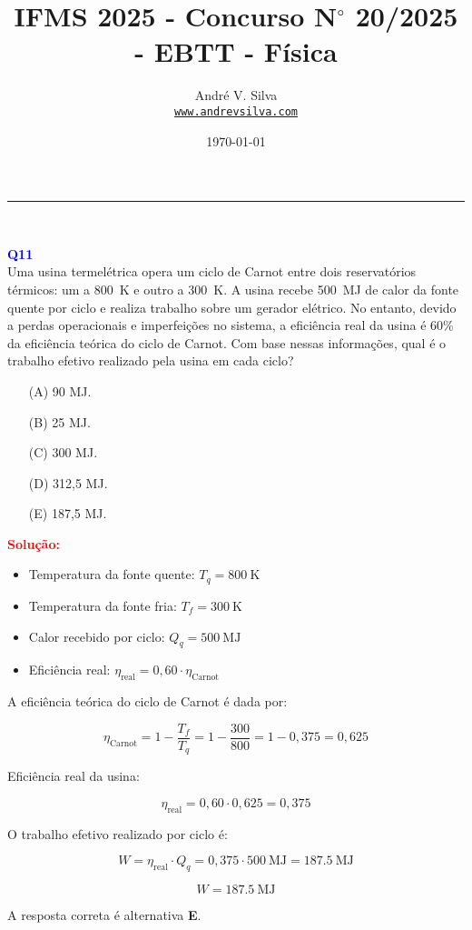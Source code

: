 \documentclass[a4paper,12pt]{article}
\title{ \textbf{\large IFMS 2025 - Concurso N$^{\circ}$ 20/2025 - EBTT - F\'isica}}
\author{Andr\'e V. Silva \\ \texttt{\url{www.andrevsilva.com}}}
\date{\today}
\begin{document}
\maketitle
\noindent\rule{\linewidth}{0.4pt}\\

\justifying

\begin{flushleft}
\textbf{\textcolor{blue}{\Large Q11}}\\
\noindent
Uma usina termelétrica opera um ciclo de Carnot entre dois reservatórios térmicos: um a 
\SI{800}{\kelvin} e outro a \SI{300}{\kelvin}. A usina recebe \SI{500}{\mega\joule} de calor da 
fonte quente por ciclo e realiza trabalho sobre um gerador elétrico. No entanto, devido a perdas 
operacionais e imperfeições no sistema, a eficiência real da usina é 60\% da eficiência teórica do ciclo 
de Carnot. Com base nessas informações, qual é o trabalho efetivo realizado pela usina em cada ciclo?

\begin{itemize}
\item[(A)] 90 MJ.
\item[(B)] 25 MJ.
\item[(C)] 300 MJ.
\item[(D)] 312,5 MJ.
\item[(E)] 187,5 MJ.
\end{itemize}

\vspace{0.5cm}

\textcolor{red}{\textbf{Solução:}}\\

\begin{itemize}
    \item Temperatura da fonte quente: \( T_q = \SI{800}{\kelvin} \)
    \item Temperatura da fonte fria: \( T_f = \SI{300}{\kelvin} \)
    \item Calor recebido por ciclo: \( Q_q = \SI{500}{\mega\joule} \)
    \item Eficiência real: \( \eta_{\text{real}} = 0{,}60 \cdot \eta_{\text{Carnot}} \)
\end{itemize}

\vspace{1em}
A eficiência teórica do ciclo de Carnot é dada por:

\[
\eta_{\text{Carnot}} = 1 - \frac{T_f}{T_q} = 1 - \frac{300}{800} = 1 - 0{,}375 = 0{,}625
\]

Eficiência real da usina:

\[
\eta_{\text{real}} = 0{,}60 \cdot 0{,}625 = 0{,}375
\]

O trabalho efetivo realizado por ciclo é:

\[
W = \eta_{\text{real}} \cdot Q_q = 0{,}375 \cdot \SI{500}{\mega\joule} = \SI{187.5}{\mega\joule}
\]

\[
\boxed{W = \SI{187.5}{\mega\joule}}
\]

A resposta correta é alternativa \colorbox{green!50}{\textbf{E}}.

\end{flushleft}
\end{document}
